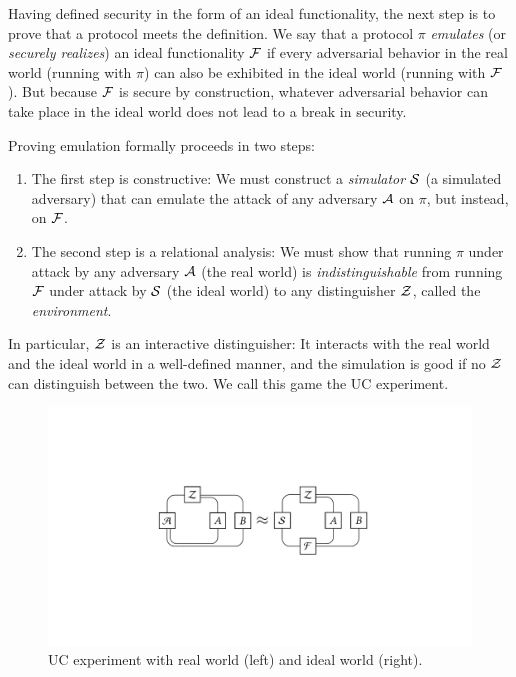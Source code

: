 Having defined security in the form of an ideal functionality, the next step is
to prove that a protocol meets the definition. We say that a protocol $\pi$
\emph{emulates} (or \emph{securely realizes}) an ideal functionality $\mathcal{{F}}$ if
every adversarial behavior in the real world (running with $\pi$) can also be
exhibited in the ideal world (running with $\mathcal{{F}}$). But because $\mathcal{{F}}$ is
secure by construction, whatever adversarial behavior can take place in the
ideal world does not lead to a break in security.

Proving emulation formally proceeds in two steps:
\begin{enumerate}[leftmargin=*]
\item The first step is constructive: We must construct a \emph{simulator}
  $\mathcal{{S}}$ (a simulated adversary) that can emulate the attack of any adversary
  $\mathcal{{A}}$ on $\pi$, but instead, on $\mathcal{{F}}$.
\item The second step is a relational analysis: We must show that running $\pi$
  under attack by any adversary $\mathcal{{A}}$ (the real world) is
  \emph{indistinguishable} from running $\mathcal{{F}}$ under attack by $\mathcal{{S}}$ (the
  ideal world) to any distinguisher $\mathcal{{Z}}$, called the \emph{environment}.
\end{enumerate}
In particular, $\mathcal{{Z}}$ is an interactive distinguisher: It interacts with the
real world and the ideal world in a well-defined manner, and the simulation is
good if no $\mathcal{{Z}}$ can distinguish between the two. We call this game the UC
experiment.

\begin{figure}
  \centering
  \includegraphics[width=0.85\linewidth]{graphics/suc-experiment}
  \caption{UC experiment with real world (left) and ideal world (right).}
  \label{fig:uc-experiment}
\end{figure}

